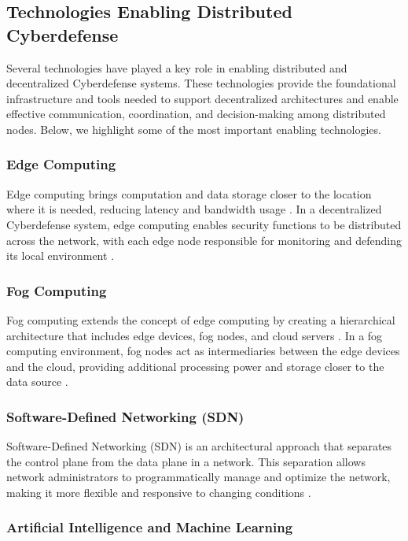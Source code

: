 \subsection{Technologies Enabling Distributed Cyberdefense}

Several technologies have played a key role in enabling distributed and decentralized Cyberdefense systems. These technologies provide the foundational infrastructure and tools needed to support decentralized architectures and enable effective communication, coordination, and decision-making among distributed nodes. Below, we highlight some of the most important enabling technologies.

\subsubsection{Edge Computing}

Edge computing brings computation and data storage closer to the location where it is needed, reducing latency and bandwidth usage \cite{Shi2016}. In a decentralized Cyberdefense system, edge computing enables security functions to be distributed across the network, with each edge node responsible for monitoring and defending its local environment \cite{Roman2018}.

\subsubsection{Fog Computing}

Fog computing extends the concept of edge computing by creating a hierarchical architecture that includes edge devices, fog nodes, and cloud servers \cite{Bonomi2012}. In a fog computing environment, fog nodes act as intermediaries between the edge devices and the cloud, providing additional processing power and storage closer to the data source \cite{Mukherjee2017}.

\subsubsection{Software-Defined Networking (SDN)}

Software-Defined Networking (SDN) is an architectural approach that separates the control plane from the data plane in a network. This separation allows network administrators to programmatically manage and optimize the network, making it more flexible and responsive to changing conditions \cite{Kreutz2015}.

\subsubsection{Artificial Intelligence and Machine Learning}

